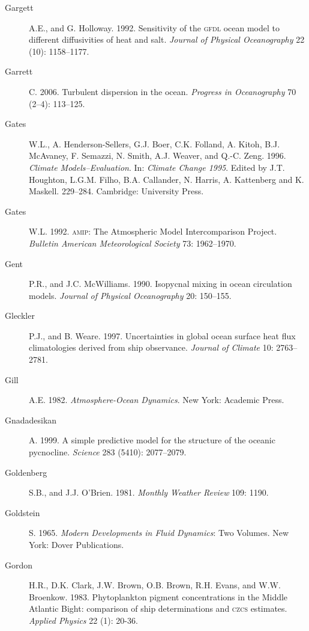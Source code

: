 \begin{description}
\item[Gargett]A.E., and G. Holloway. 1992. Sensitivity of the \textsc{gfdl}
ocean model to different diffusivities of heat and salt. \textit{Journal of
Physical Oceanography} 22 (10): 1158--1177.

\item [Garrett]C. 2006. Turbulent dispersion in the ocean. \textit{Progress in Oceanography} 70 (2--4): 113--125.

\item[Gates]W.L., A. Henderson-Sellers, G.J. Boer, C.K. Folland, A. Kitoh, B.J. McAvaney, F. Semazzi, N. Smith, A.J. Weaver, and Q.-C. Zeng. 1996. \textit{Climate Models--Evaluation}. In: \textit{Climate Change 1995}. Edited by J.T. Houghton, L.G.M. Filho, B.A. Callander, N. Harris, A. Kattenberg and K.
Maskell. 229--284. Cambridge: University Press.

\item [Gates]W.L. 1992. \textsc{amip}: The Atmospheric Model Intercomparison Project.
\textit{Bulletin American Meteorological Society} 73: 1962--1970.

\item[Gent]P.R., and J.C. McWilliams. 1990. Isopycnal mixing in ocean
circulation models. \textit{Journal of Physical Oceanography} 20: 150--155.

\item [Gleckler]P.J., and B. Weare. 1997. Uncertainties in global ocean surface
heat flux climatologies derived from ship observance. \textit{Journal of Climate}
10: 2763--2781.

\item [Gill]A.E. 1982. \textit{Atmosphere-Ocean Dynamics}. New York: Academic Press.

\item [Gnadadesikan]A. 1999. A simple predictive model for the structure of the
oceanic pycnocline. \textit{Science} 283 (5410): 2077--2079.

\item [Goldenberg]S.B., and J.J. O'Brien. 1981. \textit{Monthly Weather Review}
109: 1190.

\item [Goldstein]S. 1965. \textit{Modern Developments in Fluid Dynamics}: Two
Volumes. New York: Dover Publications.

\item [Gordon]H.R., D.K. Clark, J.W. Brown, O.B. Brown, R.H. Evans, and W.W.
Broenkow. 1983. Phytoplankton pigment concentrations in the Middle Atlantic
Bight: comparison of ship determinations and \textsc{czcs} estimates. \textit{Applied 
Physics} 22 (1): 20-36.


\end{description}
